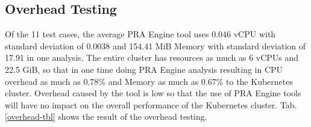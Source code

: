 \documentclass[conference]{configs/IEEEtran}
\begin{document}
%

\subsection{Overhead Testing}
Of the 11 test cases, the average PRA Engine tool uses 0.046
vCPU with standard deviation of 0.0038 and 154.41 MiB Memory with standard
deviation of 17.91 in one analysis. The entire cluster has resources
as much as 6 vCPUs and 22.5 GiB, so that in one time doing PRA Engine analysis
resulting in CPU overhead as much as 0.78\% and Memory as much as 0.67\% to the Kubernetes cluster. Overhead caused by the tool is low so that the use of PRA Engine tools will have no impact on the overall performance of the Kubernetes cluster. Tab. \ref{overhead-tbl} shows the result of the overhead testing.
\end{document}
